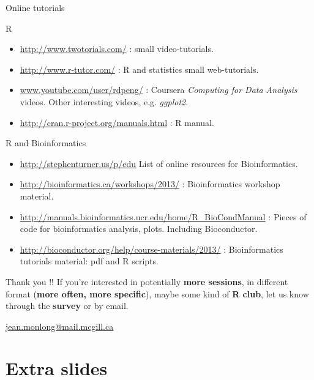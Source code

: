 \documentclass[10pt]{beamer}
\begin{document}
\begin{frame}[shrink=10]{Online tutorials}
  \begin{block}{R}
    \begin{itemize}
    \item \url{http://www.twotorials.com/} : small video-tutorials.
    \item \url{http://www.r-tutor.com/} : R and statistics small web-tutorials.
    \item \url{www.youtube.com/user/rdpeng/} : Coursera {\it Computing for Data Analysis} videos. Other interesting videos, e.g. {\it ggplot2}.
    \item \url{http://cran.r-project.org/manuals.html} : R manual.
    \end{itemize}
  \end{block}
  \begin{block}{R and Bioinformatics}
    \begin{itemize}
    \item \url{http://stephenturner.us/p/edu} List of online resources for Bioinformatics.
    \item \url{http://bioinformatics.ca/workshops/2013/} : Bioinformatics workshop material.
    \item \url{http://manuals.bioinformatics.ucr.edu/home/R_BioCondManual} : Pieces of code for bioinformatics analysis, plots. Including Bioconductor.
    \item \url{http://bioconductor.org/help/course-materials/2013/} : Bioinformatics tutorials material: pdf and R scripts.
    \end{itemize}
  \end{block}
\end{frame}


\begin{frame}{Thank you !!}
  \centering
  If you're interested in potentially {\bf more sessions}, in different format ({\bf more often, more specific}), maybe some kind of {\bf R club}, let us know through the {\bf survey} or by email.

  \bigskip
  \bigskip

  \uline{\href{mailto:jean.monlong@mail.mcgill.ca}{jean.monlong@mail.mcgill.ca}}
\end{frame}


\section{Extra slides}

\end{document}
